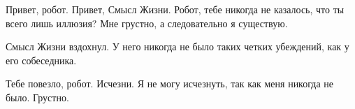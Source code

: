 \begin{dialog}
\X Привет, робот.
\R Привет, Смысл Жизни.
\X Робот, тебе никогда не казалось, что ты всего лишь иллюзия?
\R Мне грустно, а следовательно я существую.
\end{dialog}

\begin{monolog}
Смысл Жизни вздохнул. У него никогда не было таких четких убеждений, как у его собеседника.
\end{monolog}

\begin{dialog}
\X Тебе повезло, робот.
\R Исчезни.
\X Я не могу исчезнуть, так как меня никогда не было.
\R Грустно.
\end{dialog}